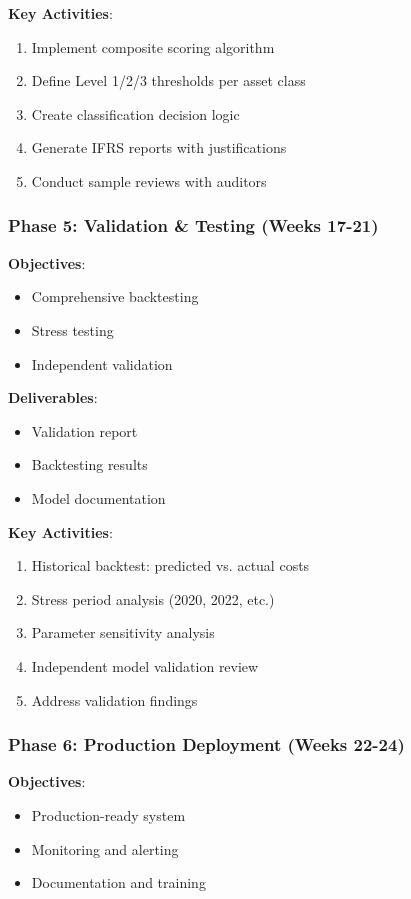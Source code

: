 \documentclass[11pt,a4paper]{article}
\begin{document}
\textbf{Key Activities}:
\begin{enumerate}
    \item Implement composite scoring algorithm
    \item Define Level 1/2/3 thresholds per asset class
    \item Create classification decision logic
    \item Generate IFRS reports with justifications
    \item Conduct sample reviews with auditors
\end{enumerate}

\subsubsection{Phase 5: Validation \& Testing (Weeks 17-21)}

\textbf{Objectives}:
\begin{itemize}
    \item Comprehensive backtesting
    \item Stress testing
    \item Independent validation
\end{itemize}

\textbf{Deliverables}:
\begin{itemize}
    \item Validation report
    \item Backtesting results
    \item Model documentation
\end{itemize}

\textbf{Key Activities}:
\begin{enumerate}
    \item Historical backtest: predicted vs. actual costs
    \item Stress period analysis (2020, 2022, etc.)
    \item Parameter sensitivity analysis
    \item Independent model validation review
    \item Address validation findings
\end{enumerate}

\subsubsection{Phase 6: Production Deployment (Weeks 22-24)}

\textbf{Objectives}:
\begin{itemize}
    \item Production-ready system
    \item Monitoring and alerting
    \item Documentation and training
\end{itemize}
\end{document}

